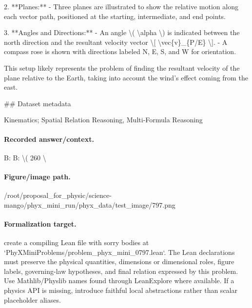2. **Planes:**
   - Three planes are illustrated to show the relative motion along each vector path, positioned at the starting, intermediate, and end points.

3. **Angles and Directions:**
   - An angle \textbackslash{}( \textbackslash{}alpha \textbackslash{}) is indicated between the north direction and the resultant velocity vector \textbackslash{}[ \textbackslash{}vec\{v\}\_\{P/E\} \textbackslash{}].
   - A compass rose is shown with directions labeled N, E, S, and W for orientation.

This setup likely represents the problem of finding the resultant velocity of the plane relative to the Earth, taking into account the wind's effect coming from the east.

\#\# Dataset metadata

Kinematics; Spatial Relation Reasoning, Multi-Formula Reasoning

\paragraph{Recorded answer/context.}
B: B: \textbackslash{}( 260 \textbackslash{}

\paragraph{Figure/image path.}
/root/proposal\_for\_physic/science-mango/phyx\_mini\_run/phyx\_data/test\_image/797.png

\paragraph{Formalization target.}
create a compiling Lean file with sorry bodies at `PhyXMiniProblems/problem\_phyx\_mini\_0797.lean`. The Lean declarations must preserve the physical quantities, dimensions or dimensional roles, figure labels, governing-law hypotheses, and final relation expressed by this problem.
Use Mathlib/Physlib names found through LeanExplore where available. If a physics API is missing, introduce faithful local abstractions rather than scalar placeholder aliases.

